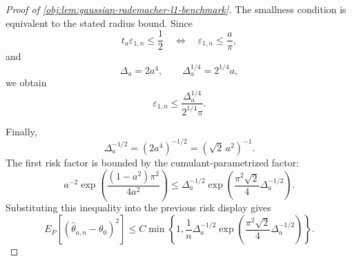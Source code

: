 \documentclass[11pt]{article}
\begin{document}
\begin{proof}[Proof of \cref{obj:lem:gaussian-rademacher-l1-benchmark}]
The smallness condition is equivalent to the stated radius bound.  Since
\[
t_a\varepsilon_{1,n}\le\frac12
\quad\Longleftrightarrow\quad
\varepsilon_{1,n}\le\frac{a}{\pi},
\]
and
\[
\Delta_a=2a^4,
\qquad
\Delta_a^{1/4}=2^{1/4}a,
\]
we obtain
\[
\varepsilon_{1,n}
\le
\frac{\Delta_a^{1/4}}{2^{1/4}\pi}.
\]

Finally,
\[
\Delta_a^{-1/2}
=
(2a^4)^{-1/2}
=
(\sqrt2\,a^2)^{-1}.
\]
The first risk factor is bounded by the cumulant-parametrized factor:
\[
a^{-2}\exp\!\left(\frac{(1-a^2)\pi^2}{4a^2}\right)
\le
\Delta_a^{-1/2}
\exp\!\left(\frac{\pi^2\sqrt2}{4}\Delta_a^{-1/2}\right).
\]
Substituting this inequality into the previous risk display gives
\[
E_P[(\widehat\theta_{a,n}-\theta_0)^2]
\le
C\min\!\left\{
1,\frac1n\Delta_a^{-1/2}
\exp\!\left(\frac{\pi^2\sqrt2}{4}\Delta_a^{-1/2}\right)
\right\}.
\]
\end{proof}




\end{document}
